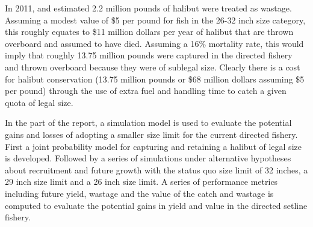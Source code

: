  In 2011, and estimated 2.2 million pounds of halibut were treated as wastage.  Assuming a modest value of \$5 per pound for fish in the 26-32 inch size category, this roughly equates to \$11 million dollars per year of halibut that are thrown overboard and assumed to have died.  Assuming a 16\% mortality rate, this would imply that roughly 13.75 million pounds were captured in the directed fishery and thrown overboard because they were of sublegal size.  Clearly there is a cost for halibut conservation (13.75 million pounds or \$68 million dollars assuming \$5 per pound) through the use of extra fuel and handling time to catch a given quota of legal size.

In the part of the report, a simulation model is used to evaluate the potential gains and losses of adopting a smaller size limit for the current directed fishery.  First a joint probability model for capturing and retaining a halibut of legal size is developed.  Followed by a series of simulations under alternative hypotheses about recruitment and future growth with the status quo size limit of 32 inches, a 29 inch size limit and a 26 inch size limit.  A series of performance metrics including future yield, wastage and the value of the catch and wastage is computed to evaluate the potential gains in yield and value in the directed setline fishery.

